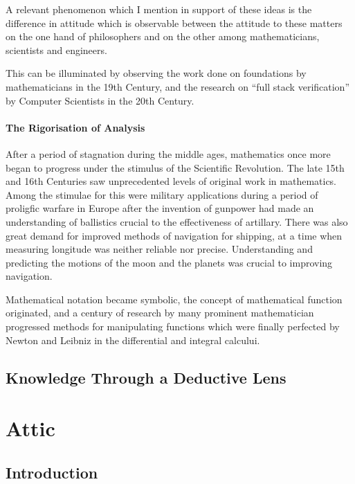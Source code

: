 \documentclass[10pt,titlepage]{book}
\begin{document}
A relevant phenomenon which I mention in support of these ideas is the difference in attitude which is observable between the attitude to these matters on the one hand of philosophers and on the other among mathematicians, scientists and engineers.

This can be illuminated by observing the work done on foundations by mathematicians in the 19th Century, and the research on ``full stack verification'' by Computer Scientists in the 20th Century.

\subsection{The Rigorisation of Analysis}

After a period of stagnation during the middle ages, mathematics once more began to progress under the stimulus of the Scientific Revolution.
The late 15th and 16th Centuries saw unprecedented levels of original work in mathematics.
Among the stimulae for this were military applications during a period of proligfic warfare in Europe after the invention of gunpower had made an understanding of ballistics crucial to the effectiveness of artillary.
There was also great demand for improved methods of navigation for shipping, at a time when measuring longitude was neither reliable nor precise.
Understanding and predicting the motions of the moon and the planets was crucial to improving navigation.


Mathematical notation became symbolic, the concept of mathematical function originated, and a century of research by many prominent mathematician progressed methods for manipulating functions which were finally perfected by Newton and Leibniz in the differential and integral calcului.




\chapter{Knowledge Through a Deductive Lens}\label{ChapKTDL}

\part{Attic}



\chapter{Introduction}
\end{document}
